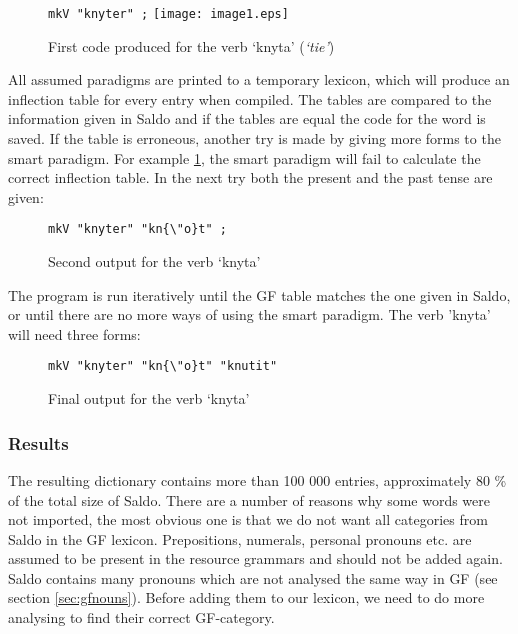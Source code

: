 \documentclass[10pt, a4paper]{article}
\begin{document}
\begin{figure}[h]
\begin{center}
\verb-mkV "knyter" ;-
\texttt{[image: image1.eps]} 
\caption{First code produced for the verb `knyta' (\emph{`tie'})}
\label{fig:saldoknyt}
\end{center}
\end{figure}

All assumed paradigms are printed to a temporary lexicon, 
which will produce an inflection table for every entry when compiled.
The tables are compared to the information given
in Saldo and if the tables are equal the code for the word is saved. If the table
is erroneous, another try is made
by giving more forms to the smart paradigm.
For example \ref{fig:saldoknyt}, the smart paradigm will fail to calculate the
correct inflection table. In the next try both the present and the past tense
are given:\\

\begin{figure}[h]
\begin{center}
\verb-mkV "knyter" "kn{\"o}t" ;-
\caption{Second output for the verb `knyta'}
\label{fig:saldoknyt2}
\end{center}
\end{figure}

The program is run iteratively until the GF table matches the one given in Saldo,
or until there are no more ways of using the smart paradigm. The verb 'knyta'
will need three forms:\\

\begin{figure}[h]
\begin{center}
\verb-mkV "knyter" "kn{\"o}t" "knutit"-\\
\caption{Final output for the verb `knyta'}
\label{fig:saldoknyt3}
\end{center}
\end{figure}


\subsubsection{Results}
\label{sec:saldoRes}
The resulting dictionary contains more than 100 000 entries, approximately 80 \% 
of the total size of Saldo.
There are a number of reasons why some words were not imported,
the most obvious one is that we do not want all categories from
Saldo in the GF lexicon. Prepositions, 
numerals, 
personal pronouns etc.
are assumed to be present in the resource grammars and should not be added again.
Saldo contains many pronouns which
are not analysed the same way in GF %
(see section \ref{sec:gfnouns}).
Before adding them to our lexicon, we need to do more analysing to find their
correct GF-category. 
\end{document}
